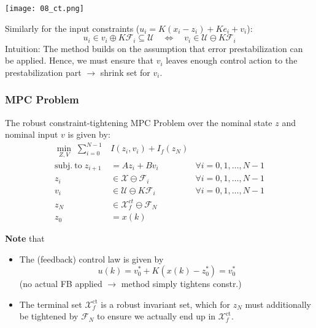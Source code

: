 \begin{center}
    \texttt{[image: 08\_ct.png]}
\end{center}

\newpar{}
Similarly for the input constraints ($u_i = K(x_i - z_i) + K e_i + v_i$): %
\begin{equation*}
    u_i \in v_i \oplus K \mathcal{F}_i \subseteq \mathcal{U}\quad \Leftrightarrow \quad v_i \in \mathcal{U} \ominus K\mathcal{F}_i
\end{equation*}
Intuition: The method builds on the assumption that error prestabilization can be applied. Hence, we must ensure that $v_i$ leaves enough control action to the prestabilization part $\rightarrow$ shrink set for $v_i$.

\subsubsection{MPC Problem}
The robust constraint-tightening MPC Problem over the nominal state $z$ and nominal input $v$ is given by:
\begin{align*}
    \min_{Z,V}\;         \sum_{i=0}^{N-1}                                                               & I(z_{i},v_{i})+I_{f}(z_{N})                                                \\
    \mathrm{subj.~to}\;                                                                         z_{i+1} & =Az_{i}+Bv_{i}                               & \forall i=0, 1, \ldots, N-1 \\
    z_{i}                                                                                               & \in\mathcal{X}\ominus\mathcal{F}_{i}         & \forall i=0, 1, \ldots, N-1 \\
    v_i                                                                                                 & \in\mathcal{U}\ominus K\mathcal{F}_i         & \forall i=0, 1, \ldots, N-1 \\
    z_{N}                                                                                               & \in\mathcal{X}_{f}^{ct}\ominus \mathcal{F}_N                               \\
    z_0                                                                                                 & =x(k)
\end{align*}



\textbf{Note} that
\begin{itemize}
    \item The (feedback) control law is given by
          \begin{equation*}
              u(k) = v_0^* + K(x(k) - z_0^*) = v_0^*
          \end{equation*}
          (no actual FB applied $\rightarrow$ method simply tightens constr.)
    \item The terminal set $\mathcal{X}_f^{\mathrm{ct}}$ is a robust invariant set, which for $z_{N}$ must additionally be tightened by $\mathcal{F}_N$ to ensure we actually end up in $\mathcal{X}_f^{\mathrm{ct}}$.
\end{itemize}

